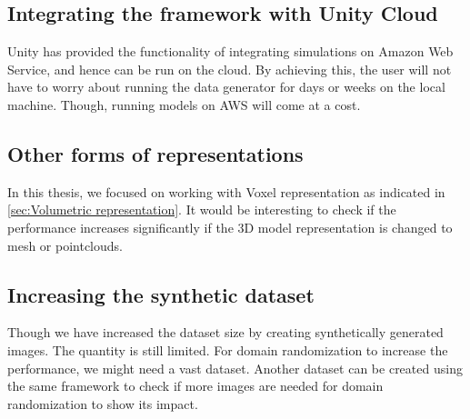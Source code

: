 \subsection{Integrating the framework with Unity Cloud}
Unity has provided the functionality of integrating simulations on Amazon Web Service, and hence can be run on the cloud.
By achieving this, the user will not have to worry about running the data generator for days or weeks on the local machine.
Though, running models on AWS will come at a cost.

\subsection{Other forms of representations}
In this thesis, we focused on working with Voxel representation as indicated in \autoref{sec:Volumetric representation}.
It would be interesting to check if the performance increases significantly if the 3D model representation is changed to mesh or pointclouds.

\subsection{Increasing the synthetic dataset}
Though we have increased the dataset size by creating synthetically generated images.
The quantity is still limited.
For domain randomization to increase the performance, we might need a vast dataset.
Another dataset can be created using the same framework to check if more images are needed for domain randomization to show its impact.


